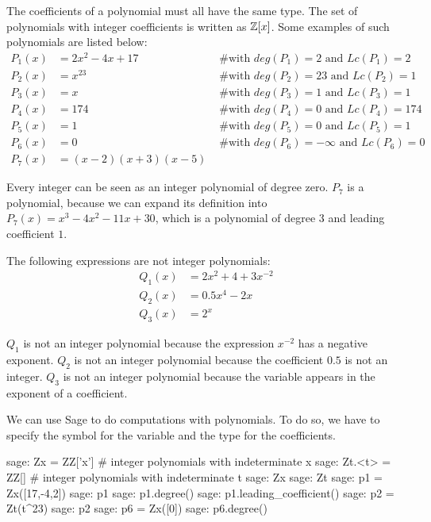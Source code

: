 \begin{example}
\label{example:integer_polynomials} The coefficients of a polynomial must all have the same type. The set of polynomials with integer coefficients is written as $\mathbb{Z}[x]$. Some examples of such polynomials are listed below:
\begin{align*}
P_1(x) &= 2x^2 -4x +17 & \text{ \# with } deg(P_1)=2 \text{ and } Lc(P_1)=2\\
P_2(x) &= x^{23} & \text{ \# with } deg(P_2)=23 \text{ and } Lc(P_2)=1\\
P_3(x) &= x & \text{ \# with }  deg(P_3)=1 \text{ and } Lc(P_3)=1\\
P_4(x) &= 174 & \text{ \# with }  deg(P_4)=0 \text{ and } Lc(P_4)=174\\
P_5(x) &= 1 & \text{ \# with }  deg(P_5)=0 \text{ and } Lc(P_5)=1\\
P_6(x) &= 0 & \text{ \# with }  deg(P_6)=-\infty \text{ and } Lc(P_6)=0\\
P_7(x) &= (x-2)(x+3)(x-5)
\end{align*}

Every integer can be seen as an integer polynomial of degree zero. $P_7$ is a polynomial, because we can expand its definition into $P_7(x)=x^3 - 4 x^2 - 11 x + 30$, which is a polynomial of degree $3$ and leading coefficient $1$. 

The following expressions are not integer polynomials:
\begin{align*}
Q_1(x) &= 2x^2 + 4 + 3x^{-2}\\
Q_2(x) &= 0.5x^4 -2x\\
Q_3(x) &=2^x
\end{align*}

$Q_1$ is not an integer polynomial because the expression $x^{-2}$ has a negative exponent. $Q_2$ is not an integer polynomial because the coefficient $0.5$ is not an integer. $Q_3$ is not an integer polynomial because the variable appears in the exponent of a coefficient.

We can use  Sage to do computations with polynomials. To do so, we have to specify the symbol for the variable and the type for the coefficients.  
\begin{sagecommandline}
sage: Zx = ZZ['x'] # integer polynomials with indeterminate x
sage: Zt.<t> = ZZ[] # integer polynomials with indeterminate t
sage: Zx
sage: Zt
sage: p1 = Zx([17,-4,2])
sage: p1
sage: p1.degree()
sage: p1.leading_coefficient()
sage: p2 = Zt(t^23)
sage: p2
sage: p6 = Zx([0])
sage: p6.degree()
\end{sagecommandline}
\end{example}
